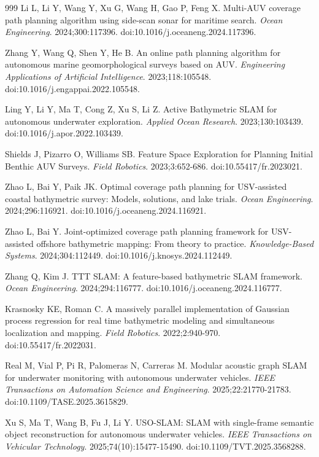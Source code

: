 \documentclass[jmse,article,submit,moreauthors]{Definitions/mdpi}
\begin{document}
\begin{thebibliography}{999}
Li L, Li Y, Wang Y, Xu G, Wang H, Gao P, Feng X. Multi-AUV coverage path planning algorithm using side-scan sonar for maritime search. \textit{Ocean Engineering}. 2024;300:117396. doi:10.1016/j.oceaneng.2024.117396.

Zhang Y, Wang Q, Shen Y, He B. An online path planning algorithm for autonomous marine geomorphological surveys based on AUV. \textit{Engineering Applications of Artificial Intelligence}. 2023;118:105548. doi:10.1016/j.engappai.2022.105548.

Ling Y, Li Y, Ma T, Cong Z, Xu S, Li Z. Active Bathymetric SLAM for autonomous underwater exploration. \textit{Applied Ocean Research}. 2023;130:103439. doi:10.1016/j.apor.2022.103439.

Shields J, Pizarro O, Williams SB. Feature Space Exploration for Planning Initial Benthic AUV Surveys. \textit{Field Robotics}. 2023;3:652-686. doi:10.55417/fr.2023021.

Zhao L, Bai Y, Paik JK. Optimal coverage path planning for USV-assisted coastal bathymetric survey: Models, solutions, and lake trials. \textit{Ocean Engineering}. 2024;296:116921. doi:10.1016/j.oceaneng.2024.116921.

Zhao L, Bai Y. Joint-optimized coverage path planning framework for USV-assisted offshore bathymetric mapping: From theory to practice. \textit{Knowledge-Based Systems}. 2024;304:112449. doi:10.1016/j.knosys.2024.112449.

Zhang Q, Kim J. TTT SLAM: A feature-based bathymetric SLAM framework. \textit{Ocean Engineering}. 2024;294:116777. doi:10.1016/j.oceaneng.2024.116777.

Krasnosky KE, Roman C. A massively parallel implementation of Gaussian process regression for real time bathymetric modeling and simultaneous localization and mapping. \textit{Field Robotics}. 2022;2:940-970. doi:10.55417/fr.2022031.

Real M, Vial P, Pi R, Palomeras N, Carreras M. Modular acoustic graph SLAM for underwater monitoring with autonomous underwater vehicles. \textit{IEEE Transactions on Automation Science and Engineering}. 2025;22:21770-21783. doi:10.1109/TASE.2025.3615829.

Xu S, Ma T, Wang B, Fu J, Li Y. USO-SLAM: SLAM with single-frame semantic object reconstruction for autonomous underwater vehicles. \textit{IEEE Transactions on Vehicular Technology}. 2025;74(10):15477-15490. doi:10.1109/TVT.2025.3568288.


\end{thebibliography}
\end{document}
